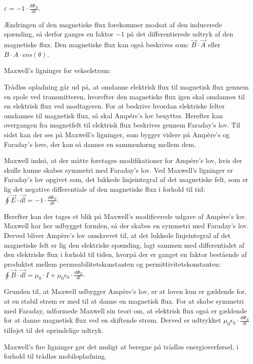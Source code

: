 \centerline{$\varepsilon = -1 \cdot \frac{d \Phi_B}{dt}$. \cite{faraday}}

Ændringen af den magnetiske flux forekommer modsat af den inducerede spænding, så derfor ganges en faktor $-1$ på det differentierede udtryk af den magnetiske flux. Den magnetiske flux kan også beskrives som: $\vec{B} \cdot \vec{A}$ eller $B \cdot A \cdot cos(\theta)$.

Maxwell's ligninger for vekselstrøm:

Trådløs opladning går ud på, at omdanne elektrisk flux til magnetisk flux gennem en spole ved transmitteren, hvorefter den magnetiske flux igen skal omdannes til en elektrisk flux ved modtageren. For at beskrive hvordan elektriske felter omdannes til magnetisk flux, så skal Ampére's lov benyttes. Herefter kan overgangen fra magnetfelt til elektrisk flux beskrives gennem Faraday's lov. Til sidst kan der ses på Maxwell's ligninger, som bygger videre på Ampère's og Faraday's love, der kan så dannes en sammenhæng mellem dem.

Maxwell indså, at der måtte foretages modifikationer for Ampére's lov, hvis der skulle kunne skabes symmetri med Faraday's lov. Ved Maxwell's ligninger er Faraday's lov opgivet som, det lukkede linjeintegral af det magnetiske felt, som er lig det negative differentiale af den magnetiske flux i forhold til tid: $\oint \vec{E} \cdot \vec{dl} = -1 \cdot \frac{d \Phi_B}{dt}$.

Herefter kan der tages et blik på Maxwell's modificerede udgave af Ampère's lov. Maxwell har her udbygget formlen, så der skabes en symmetri med Faraday's lov. Derved bliver Ampère's lov omskrevet til, at det lukkede linjeintegral af det magnetiske felt er lig den elektriske spænding, lagt sammen med differentialet af den elektriske flux i forhold til tiden, hvorpå der er ganget en faktor bestående af produktet mellem permeabilitetskonstanten og permittivitetskonstanten: $\oint \vec{B} \cdot \vec{dl} = \mu_0 \cdot I + \mu_0 \epsilon_0 \cdot \frac{d \Phi_E}{dt}$. \citep{maxwell}

Grunden til, at Maxwell udbygger Ampère's lov, er at loven kun er gældende for, at en stabil strøm er med til at danne en magnetisk flux. For at skabe symmetri med Faraday, udformede Maxwell sin teori om, at elektrisk flux også er gældende for at danne magnetisk flux ved en skiftende strøm. Derved er udtrykket $\mu_0 \epsilon_0 \cdot \frac{d \Phi_E}{dt}$ tilføjet til det oprindelige udtryk.

Maxwell's fire ligninger gør det muligt at beregne på trådløs energioverførsel, i forhold til trådløs mobilopladning.

\newpage